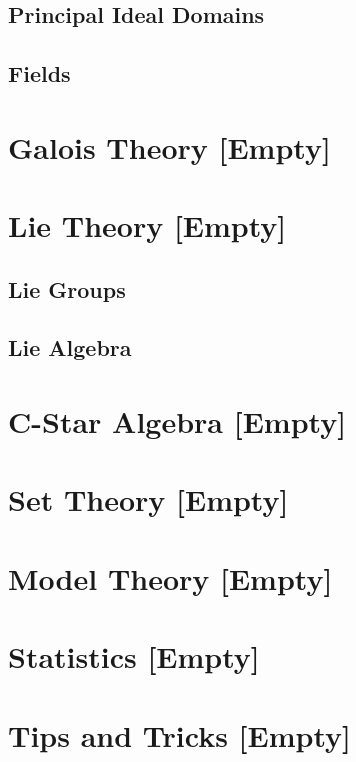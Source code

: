 \documentclass[12pt, english]{book}
\begin{document}
	\chapter{Principal Ideal Domains} \label{Principal Ideal Domains Chapter - Abstract Algebra}
	
	\chapter{Fields} \label{Fields Chapter - Abstract Algebra}
	
	
	\part{Galois Theory [Empty]} \label{Galois Theory Part}
	
	\part{Lie Theory [Empty]} \label{Lie Algebra Part}
	
	\chapter{Lie Groups}
	
	\chapter{Lie Algebra}
	
	\part{C-Star Algebra [Empty]} \label{C-Star Algebra Part}
	
	\part{Set Theory [Empty]} \label{Set Theory Part}
	
	\part{Model Theory [Empty]} \label{Model Theory Part}
	
	\part{Statistics [Empty]} \label{Statistics Part}
	\part{Tips and Tricks [Empty]} \label{Tips and Tricks Part}
	
\end{document}
